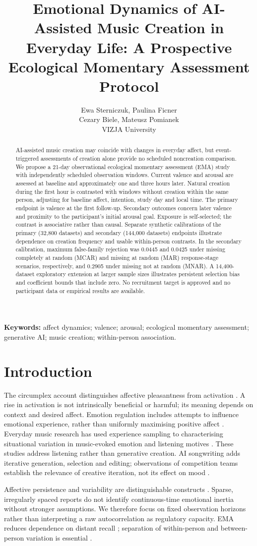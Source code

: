 \documentclass[11pt]{article}
\title{Emotional Dynamics of AI-Assisted Music Creation in Everyday Life: A Prospective Ecological Momentary Assessment Protocol}
\author{Ewa Sterniczuk, Paulina Ficner\\Cezary Biele, Mateusz Pomianek\\[0.4em]\small VIZJA University}
\begin{document}
\maketitle
\begin{abstract}
AI-assisted music creation may coincide with changes in everyday affect, but event-triggered assessments of creation alone provide no scheduled noncreation comparison. We propose a 21-day observational ecological momentary assessment (EMA) study with independently scheduled observation windows. Current valence and arousal are assessed at baseline and approximately one and three hours later. Natural creation during the first hour is contrasted with windows without creation within the same person, adjusting for baseline affect, intention, study day and local time. The primary endpoint is valence at the first follow-up. Secondary outcomes concern later valence and proximity to the participant's initial arousal goal. Exposure is self-selected; the contrast is associative rather than causal. Separate synthetic calibrations of the primary (32,800 datasets) and secondary (144,000 datasets) endpoints illustrate dependence on creation frequency and usable within-person contrasts. In the secondary calibration, maximum false-family rejection was 0.0445 and 0.0425 under missing completely at random (MCAR) and missing at random (MAR) response-stage scenarios, respectively, and 0.2905 under missing not at random (MNAR). A 14,400-dataset exploratory extension at larger sample sizes illustrates persistent selection bias and coefficient bounds that include zero. No recruitment target is approved and no participant data or empirical results are available.
\end{abstract}
\noindent\textbf{Keywords:} affect dynamics; valence; arousal; ecological momentary assessment; generative AI; music creation; within-person association.
\section{Introduction}
The circumplex account distinguishes affective pleasantness from activation \citep{russell1980}. A rise in activation is not intrinsically beneficial or harmful; its meaning depends on context and desired affect. Emotion regulation includes attempts to influence emotional experience, rather than uniformly maximising positive affect \citep{gross2015}. Everyday music research has used experience sampling to characterising situational variation in music-evoked emotion and listening motives \citep{juslin2008,randall2017}. These studies address listening rather than generative creation. AI songwriting adds iterative generation, selection and editing; observations of competition teams establish the relevance of creative iteration, not its effect on mood \citep{huang2020}.
\par Affective persistence and variability are distinguishable constructs \citep{kuppens2010,houben2015}. Sparse, irregularly spaced reports do not identify continuous-time emotional inertia without stronger assumptions. We therefore focus on fixed observation horizons rather than interpreting a raw autocorrelation as regulatory capacity. EMA reduces dependence on distant recall \citep{shiffman2008}; separation of within-person and between-person variation is essential \citep{curran2011}.
\end{document}
